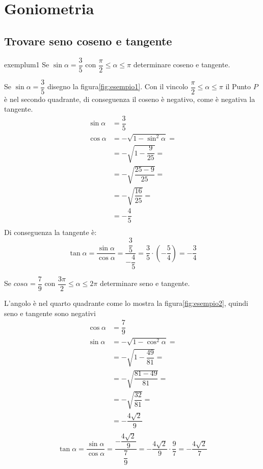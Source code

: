 \chapter{Goniometria}
\label{cha:goniometriaEss}
\section{Trovare seno coseno e tangente}
\begin{esempiot}{}{exemplum1}
	Se $\sin\alpha=\dfrac{3}{5}$ con $\dfrac{\pi}{2}\leq\alpha\leq\pi$ determinare coseno e tangente.
\end{esempiot}
Se $\sin\alpha=\dfrac{3}{5}$ disegno la figura\nobs\vref{fig:esempio1}. Con il vincolo $\dfrac{\pi}{2}\leq\alpha\leq\pi$ il Punto $P$ è nel secondo quadrante, di conseguenza il coseno è negativo, come è negativa la tangente.
\begin{align*}
\sin\alpha&=\dfrac{3}{5}\\
\cos\alpha&=-\sqrt{1-\sin^2\alpha}=\\
&=-\sqrt{1-\dfrac{9}{25}}=\\
&=-\sqrt{\dfrac{25-9}{25}}=\\
&=-\sqrt{\dfrac{16}{25}}=\\
&=-\dfrac{4}{5}\\
\end{align*}
Di conseguenza la tangente è:
\[\tan\alpha=\dfrac{\sin\alpha}{\cos\alpha}=\dfrac{\dfrac{3}{5}}{-\dfrac{4}{5}}=\dfrac{3}{5}\cdot\left(-\dfrac{5}{4}\right)=-\dfrac{3}{4}\]
\begin{esempiot}{}{}
	Se $cos\alpha=\dfrac{7}{9}$ con $\dfrac{3\pi}{2}\leq\alpha\leq 2\pi$ determinare seno e tangente.
\end{esempiot}
L'angolo è nel quarto quadrante come lo mostra la figura\nobs\vref{fig:esempio2}, quindi seno e tangente sono negativi
\begin{align*}
\cos\alpha&=\dfrac{7}{9}\\
\sin\alpha&=-\sqrt{1-\cos^2\alpha}=\\
&=-\sqrt{1-\dfrac{49}{81}}=\\
&=-\sqrt{\dfrac{81-49}{81}}=\\
&=-\sqrt{\dfrac{32}{81}}=\\
&=-\dfrac{4\sqrt{2}}{9}\\
\end{align*}
\[\tan\alpha=\dfrac{\sin\alpha}{\cos\alpha}=\dfrac{-\dfrac{4\sqrt{2}}{9}}{\dfrac{7}{9}}=-\dfrac{4\sqrt{2}}{9}\cdot\dfrac{9}{7}=-\dfrac{4\sqrt{2}}{7}\]
